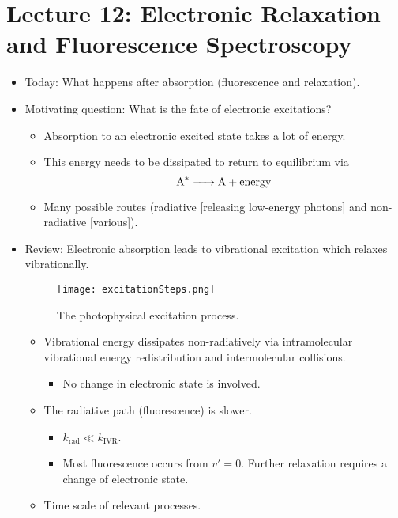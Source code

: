 \documentclass[../notes.tex]{subfiles}
\begin{document}
\section{Lecture 12: Electronic Relaxation and Fluorescence Spectroscopy}
\begin{itemize}
    \item {}Today: What happens after absorption (fluorescence and relaxation).
    \item Motivating question: What is the fate of electronic excitations?
    \begin{itemize}
        \item Absorption to an electronic excited state takes a lot of energy.
        \item This energy needs to be dissipated to return to equilibrium via
        \begin{equation*}
            \ce{A^* -> A + energy}
        \end{equation*}
        \item Many possible routes (radiative [releasing low-energy photons] and non-radiative [various]).
    \end{itemize}
    \item Review: Electronic absorption leads to vibrational excitation which relaxes vibrationally.
    \begin{figure}[H]
        \centering
        \texttt{[image: excitationSteps.png]}
        \caption{The photophysical excitation process.}
        \label{fig:excitationSteps}
    \end{figure}
    \begin{itemize}
        \item Vibrational energy dissipates non-radiatively via intramolecular vibrational energy redistribution and intermolecular collisions.
        \begin{itemize}
            \item No change in electronic state is involved.
        \end{itemize}
        \item The radiative path (fluorescence) is slower.
        \begin{itemize}
            \item $k_\text{rad}\ll k_\text{IVR}$.
            \item Most fluorescence occurs from $v'=0$. Further relaxation requires a change of electronic state.
        \end{itemize}
        \item Time scale of relevant processes.

\end{itemize}
\end{itemize}
\end{document}
